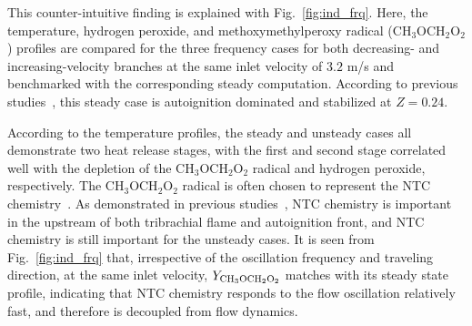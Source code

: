 \documentclass[review,3p,times]{elsarticle}
\begin{document}
\begin{table}
  \caption{\textcolor{Rev1}{Induction time at different oscillation frequencies.}}
  \label{table:ind}
  \centering
  \normalsize
\end{table}


This counter-intuitive finding is explained with Fig.~\ref{fig:ind_frq}.  Here, \textcolor{Rev1}{the temperature, hydrogen peroxide, and methoxy\-methyl\-peroxy radical (CH$_3$OCH$_2$O$_2$)} profiles are compared for the three frequency cases for both decreasing- and increasing-velocity branches at the same inlet velocity of $3.2$ m/s and benchmarked with the corresponding steady computation.  According to previous studies~\cite{deng15,deng15b}, this steady case is autoignition dominated and stabilized at $Z = 0.24$.  

\textcolor{Rev1}{According to the temperature profiles, the steady and unsteady cases all demonstrate two heat release stages, with the first and second stage correlated well with the depletion of the CH$_3$OCH$_2$O$_2$ radical and hydrogen peroxide, respectively.  The CH$_3$OCH$_2$O$_2$ radical is often chosen to represent the NTC chemistry~\cite{krisman14}.  As demonstrated in previous studies~\cite{deng15,deng15b}, NTC chemistry is important in the upstream of both tribrachial flame and autoignition front, and NTC chemistry is still important for the unsteady cases.  It is seen from Fig.~\ref{fig:ind_frq} that, irrespective of the oscillation frequency and traveling direction, at the same inlet velocity, $Y_{\rm CH_3OCH_2O_2}$ matches with its steady state profile, indicating that NTC chemistry responds to the flow oscillation relatively fast, and therefore is decoupled from flow dynamics.}
\end{document}
